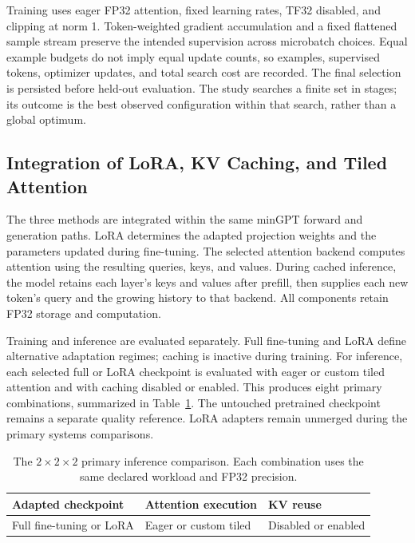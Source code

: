 Training uses eager FP32 attention, fixed learning rates, TF32 disabled, and clipping at norm 1. Token-weighted gradient accumulation and a fixed flattened sample stream preserve the intended supervision across microbatch choices. Equal example budgets do not imply equal update counts, so examples, supervised tokens, optimizer updates, and total search cost are recorded. The final selection is persisted before held-out evaluation. The study searches a finite set in stages; its outcome is the best observed configuration within that search, rather than a global optimum.

\subsection{Integration of LoRA, KV Caching, and Tiled Attention}
\label{sec:method_integration}

The three methods are integrated within the same minGPT forward and generation paths. LoRA determines the adapted projection weights and the parameters updated during fine-tuning. The selected attention backend computes attention using the resulting queries, keys, and values. During cached inference, the model retains each layer's keys and values after prefill, then supplies each new token's query and the growing history to that backend. All components retain FP32 storage and computation.

Training and inference are evaluated separately. Full fine-tuning and LoRA define alternative adaptation regimes; caching is inactive during training. For inference, each selected full or LoRA checkpoint is evaluated with eager or custom tiled attention and with caching disabled or enabled. This produces eight primary combinations, summarized in Table~\ref{tab:integration}. The untouched pretrained checkpoint remains a separate quality reference. LoRA adapters remain unmerged during the primary systems comparisons.

\begin{table}[htbp]
\centering
\begin{tabular}{@{}lll@{}}
\toprule
Adapted checkpoint & Attention execution & KV reuse\\
\midrule
Full fine-tuning or LoRA & Eager or custom tiled & Disabled or enabled\\
\bottomrule
\end{tabular}
\caption{The $2\times2\times2$ primary inference comparison. Each combination uses the same declared workload and FP32 precision.}
\label{tab:integration}
\end{table}

